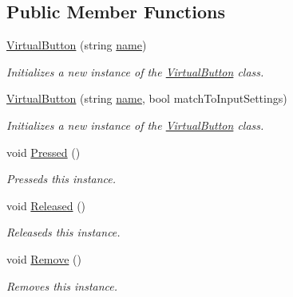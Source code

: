 \subsection*{Public Member Functions}
\begin{DoxyCompactItemize}
\item 
\hyperlink{class_lerp2_assets_1_1_cross_platform_input_1_1_cross_platform_input_manager_1_1_virtual_button_aedee6f52323dd17a3f7715df448643a0}{Virtual\+Button} (string \hyperlink{class_lerp2_assets_1_1_cross_platform_input_1_1_cross_platform_input_manager_1_1_virtual_button_a0266afd92246760f8d922f131467bc14}{name})
\begin{DoxyCompactList}\small\item\em Initializes a new instance of the \hyperlink{class_lerp2_assets_1_1_cross_platform_input_1_1_cross_platform_input_manager_1_1_virtual_button}{Virtual\+Button} class. \end{DoxyCompactList}\item 
\hyperlink{class_lerp2_assets_1_1_cross_platform_input_1_1_cross_platform_input_manager_1_1_virtual_button_a0cc887d0a2df470c05264506c4e1fac6}{Virtual\+Button} (string \hyperlink{class_lerp2_assets_1_1_cross_platform_input_1_1_cross_platform_input_manager_1_1_virtual_button_a0266afd92246760f8d922f131467bc14}{name}, bool match\+To\+Input\+Settings)
\begin{DoxyCompactList}\small\item\em Initializes a new instance of the \hyperlink{class_lerp2_assets_1_1_cross_platform_input_1_1_cross_platform_input_manager_1_1_virtual_button}{Virtual\+Button} class. \end{DoxyCompactList}\item 
void \hyperlink{class_lerp2_assets_1_1_cross_platform_input_1_1_cross_platform_input_manager_1_1_virtual_button_aa88107bb11608e772e6f950fe9c63912}{Pressed} ()
\begin{DoxyCompactList}\small\item\em Presseds this instance. \end{DoxyCompactList}\item 
void \hyperlink{class_lerp2_assets_1_1_cross_platform_input_1_1_cross_platform_input_manager_1_1_virtual_button_ae5b3e553b0f392e0c07ab4c0d991c557}{Released} ()
\begin{DoxyCompactList}\small\item\em Releaseds this instance. \end{DoxyCompactList}\item 
void \hyperlink{class_lerp2_assets_1_1_cross_platform_input_1_1_cross_platform_input_manager_1_1_virtual_button_a4d83409d6d72942e256a5a7043188801}{Remove} ()
\begin{DoxyCompactList}\small\item\em Removes this instance. \end{DoxyCompactList}\end{DoxyCompactItemize}
